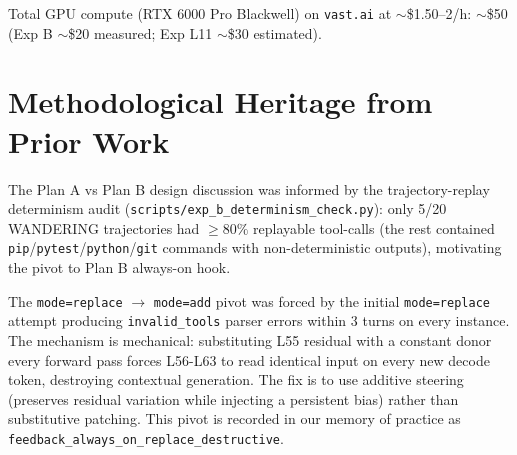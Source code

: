 \documentclass[11pt]{article}
\begin{document}
Total GPU compute (RTX 6000 Pro Blackwell) on \texttt{vast.ai} at $\sim$\$1.50--2/h: $\sim$\$50 (Exp B $\sim$\$20 measured; Exp L11 $\sim$\$30 estimated).

\section{Methodological Heritage from Prior Work}

The Plan A vs Plan B design discussion was informed by the trajectory-replay determinism audit (\texttt{scripts/exp\_b\_determinism\_check.py}): only 5/20 WANDERING trajectories had $\geq 80\%$ replayable tool-calls (the rest contained \texttt{pip}/\texttt{pytest}/\texttt{python}/\texttt{git} commands with non-deterministic outputs), motivating the pivot to Plan B always-on hook.

The \texttt{mode=replace} $\rightarrow$ \texttt{mode=add} pivot was forced by the initial \texttt{mode=replace} attempt producing \texttt{invalid\_tools} parser errors within 3 turns on every instance. The mechanism is mechanical: substituting L55 residual with a constant donor every forward pass forces L56-L63 to read identical input on every new decode token, destroying contextual generation. The fix is to use additive steering (preserves residual variation while injecting a persistent bias) rather than substitutive patching. This pivot is recorded in our memory of practice as \texttt{feedback\_always\_on\_replace\_destructive}.
\end{document}
